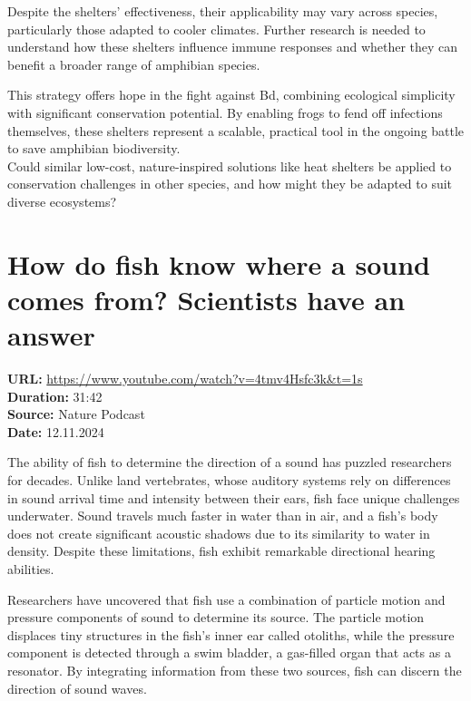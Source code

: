 \documentclass[12pt]{article}
\begin{document}
Despite the shelters' effectiveness, their applicability may vary across species, particularly those adapted to cooler climates. Further research is needed to understand how these shelters influence immune responses and whether they can benefit a broader range of amphibian species.

This strategy offers hope in the fight against Bd, combining ecological simplicity with significant conservation potential. By enabling frogs to fend off infections themselves, these shelters represent a scalable, practical tool in the ongoing battle to save amphibian biodiversity.\\[5px]


Could similar low-cost, nature-inspired solutions like heat shelters be applied to conservation challenges in other species, and how might they be adapted to suit diverse ecosystems?






\newpage

\section{How do fish know where a sound comes from? Scientists have an answer}
\textbf{URL:} \url{https://www.youtube.com/watch?v=4tmv4Hsfc3k&t=1s}\\
\textbf{Duration:} 31:42\\
\textbf{Source:} Nature Podcast\\
\textbf{Date:} 12.11.2024



The ability of fish to determine the direction of a sound has puzzled researchers for decades. Unlike land vertebrates, whose auditory systems rely on differences in sound arrival time and intensity between their ears, fish face unique challenges underwater. Sound travels much faster in water than in air, and a fish’s body does not create significant acoustic shadows due to its similarity to water in density. Despite these limitations, fish exhibit remarkable directional hearing abilities.

Researchers have uncovered that fish use a combination of particle motion and pressure components of sound to determine its source. The particle motion displaces tiny structures in the fish's inner ear called otoliths, while the pressure component is detected through a swim bladder, a gas-filled organ that acts as a resonator. By integrating information from these two sources, fish can discern the direction of sound waves.
\end{document}
